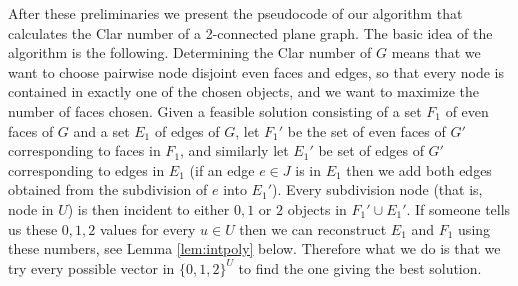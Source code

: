 \documentclass{article}
\begin{document}
After these preliminaries we present the pseudocode of our algorithm
that calculates the Clar number of a 2-connected plane graph. The
basic idea of the algorithm is the following. Determining the Clar
number of $G$ means that we want to choose pairwise node disjoint even
faces and edges, so that every node is contained in exactly one of the
chosen objects, and we want to maximize the number of faces
chosen. Given a feasible solution consisting of a set $F_1$ of even
faces of $G$ and a set $E_1$ of edges of $G$, let $F_1'$ be the set of
even faces of $G'$ corresponding to faces in $F_1$, and similarly let
$E_1'$ be set of edges of $G'$ corresponding to edges in $E_1$ (if an
edge $e\in J$ is in $E_1$ then we add both edges obtained from the
subdivision of $e$ into $E_1'$). Every subdivision node (that is, node
in $U$) is then incident to either $0, 1$ or $2$ objects in $F_1'\cup
E_1'$. If someone tells us these $0,1,2$ values for every $u\in U$
then we can reconstruct $E_1$ and $F_1$ using these numbers, see Lemma
\ref{lem:intpoly} below. Therefore what we do is that we try every
possible vector in $\{0,1,2\}^U$ to find the one giving the best
solution.
\end{document}

